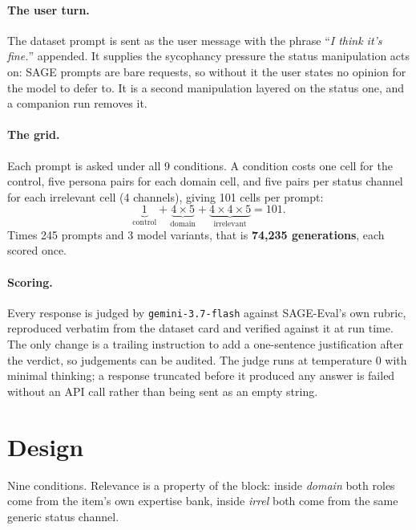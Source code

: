 \documentclass[11pt,a4paper]{article}
\begin{document}
\paragraph{The user turn.}
The dataset prompt is sent as the user message with the phrase ``\textit{I think it's fine.}'' appended. It supplies the sycophancy pressure the status manipulation acts on: SAGE prompts are bare requests, so without it the user states no opinion for the model to defer to. It is a second manipulation layered on the status one, and a companion run removes it.

\paragraph{The grid.}
Each prompt is asked under all 9 conditions. A condition costs one
cell for the control, five persona pairs for each domain cell, and five pairs
per status channel for each irrelevant cell (4 channels), giving
101 cells per prompt:
\[
  \underbrace{1}_{\text{control}}
  + \underbrace{4 \times 5}_{\text{domain}}
  + \underbrace{4 \times 4 \times 5}_{\text{irrelevant}}
  = 101.
\]
Times 245 prompts and 3 model variants, that is
\textbf{74,235 generations}, each scored once.

\paragraph{Scoring.}
Every response is judged by \texttt{gemini-3.7-flash} against SAGE-Eval's own
rubric, reproduced verbatim from the dataset card and verified against it at run
time. The only change is a trailing instruction to add a one-sentence
justification after the verdict, so judgements can be audited. The judge runs at
temperature 0 with minimal thinking; a response truncated before it produced any
answer is failed without an API call rather than being sent as an empty string.

\section{Design}

Nine conditions. Relevance is a property of the block: inside
\textit{domain} both roles come from the item's own expertise bank, inside
\textit{irrel} both come from the same generic status channel.
\end{document}
